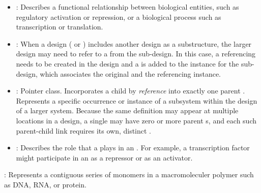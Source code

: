 \begin{description}
\begin{itemize}
\item \emph{}:
Describes a functional relationship between biological entities, such as regulatory activation or repression, or a biological process such as transcription or translation.

\item \emph{}:
When a design ( or ) includes another design as a substructure, the larger design may need to refer to a  from the sub-design.
In this case, a referencing  needs to be created in the design and a  is added to the instance for the sub-design, which associates the original and the referencing instance.

\item \emph{}:
Pointer class. Incorporates a child  by \textit{reference} into exactly one parent . Represents a specific occurrence or instance of a subsystem within the design of a larger system. Because the same definition may appear at multiple locations in a design, a single  may have zero or more parent s, and each such parent-child link requires its own, distinct .

\item \emph{}:
Describes the role that a  plays in an .
For example, a transcription factor might participate in an  as a repressor or as an activator.

\end{itemize}

\item \emph{}:
Represents a contiguous series of monomers in a macromoleculer polymer such as DNA, RNA, or protein. 

\end{description}